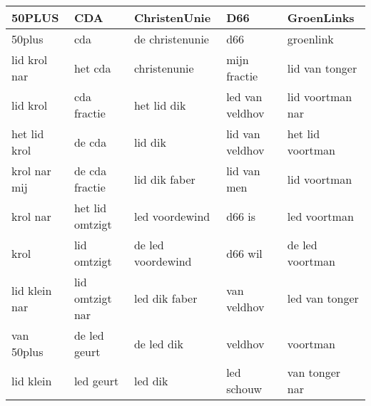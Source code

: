\begin{tabular}{lllll}
\toprule
        50PLUS &              CDA &       ChristenUnie &              D66 &        GroenLinks \\
\midrule
        50plus &              cda &    de christenunie &              d66 &         groenlink \\
  lid krol nar &          het cda &       christenunie &     mijn fractie &    lid van tonger \\
      lid krol &      cda fractie &        het lid dik &  led van veldhov &  lid voortman nar \\
  het lid krol &           de cda &            lid dik &  lid van veldhov &  het lid voortman \\
  krol nar mij &   de cda fractie &      lid dik faber &      lid van men &      lid voortman \\
      krol nar &  het lid omtzigt &     led voordewind &           d66 is &      led voortman \\
          krol &      lid omtzigt &  de led voordewind &          d66 wil &   de led voortman \\
 lid klein nar &  lid omtzigt nar &      led dik faber &      van veldhov &    led van tonger \\
    van 50plus &     de led geurt &         de led dik &          veldhov &          voortman \\
     lid klein &        led geurt &            led dik &       led schouw &    van tonger nar \\
\bottomrule
\end{tabular}
